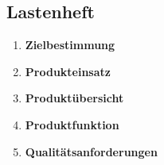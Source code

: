 \subsection{Lastenheft}
\label{app:Lastenheft}


\begin{enumerate}
\item{\textbf{Zielbestimmung}}\\


\item{\textbf{Produkteinsatz}}\\


\item{\textbf{Produktübersicht}}\\


\item{\textbf{Produktfunktion}}\\


\item{\textbf{Qualitätsanforderungen}}

\end{enumerate}	